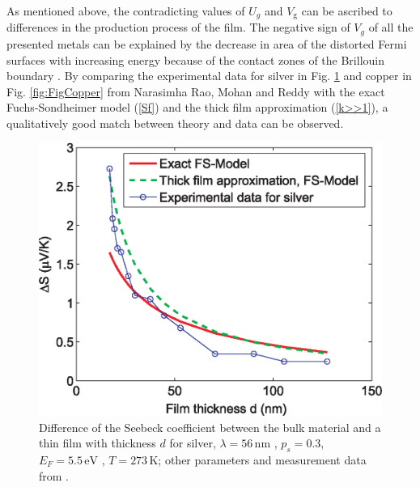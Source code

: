 \documentclass[journal]{IEEEtran}
\newcommand{\mathrmm}[1]{{#1}}
\begin{document}
As mentioned above, the contradicting values of $U_{\mathrmm{g}}$  and $V_{\mathrm{g}}$ can be ascribed to differences in the production
process of the film. The negative sign of $V_{\mathrmm{g}}$ of all the
presented metals can be explained by the decrease in area of the distorted Fermi surfaces with increasing energy because of the contact zones of the Brillouin boundary \cite{hubin1974resistivity}. By comparing the experimental data  for silver in Fig. \ref{fig:FigSilver} and copper in Fig. \ref{fig:FigCopper}  from Narasimha Rao, Mohan and Reddy with the exact Fuchs-Sondheimer model (\ref{Sf})  and the thick film approximation (\ref{k>>1}), a qualitatively good match between theory and data can be observed.

%
\begin{figure}[h]
\centerline{\includegraphics[width=.95\columnwidth,clip]{figures/SNMRn} } %
\caption{Difference of the Seebeck coefficient between the bulk material and a thin film with thickness $d$ for silver, $\lambda = 56\,  \mathrm{nm}$ \cite{hubin1974resistivity},  $p_s = 0.3$, $E_\mathrmm{F} = 5.5\, \mathrm{eV}$ \cite{ibach2003solid}, $T = 273\, \mathrm{K}$; other parameters and measurement data from \cite{rao1977size}.}
\label{fig:FigSilver}
\end{figure}
\end{document}
